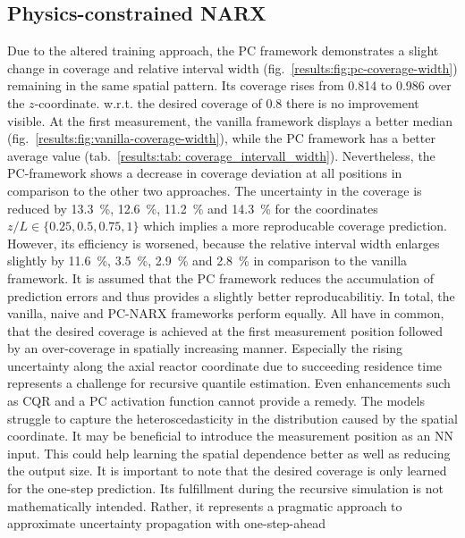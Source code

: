 \subsection{Physics-constrained NARX}

Due to the altered training approach, the PC framework demonstrates a slight change
in coverage and relative interval width (fig.~\ref{results:fig:pc-coverage-width}) remaining
in the same spatial pattern. Its coverage rises from \SI{0.814}{} to \SI{0.986}{} over the $z$-coordinate.
w.r.t. the desired coverage of $0.8$ there is no improvement visible. At the first measurement,
the vanilla framework displays a better median (fig.~\ref{results:fig:vanilla-coverage-width}),
while the PC framework has a better average value (tab.~\ref{results:tab: coverage_intervall_width}).
Nevertheless, the PC-framework shows a decrease in coverage deviation at all positions
in comparison to the other two approaches. The uncertainty in the coverage is reduced by 
\SI{13.3}{\%}, \SI{12.6}{\%}, \SI{11.2}{\%} and \SI{14.3}{\%} for the coordinates $z/L \in \{0.25, 0.5, 0.75, 1\}$
which implies a more reproducable coverage prediction.
However, its efficiency is worsened, because the relative interval width enlarges
slightly by \SI{11.6}{\%}, \SI{3.5}{\%}, \SI{2.9}{\%} and \SI{2.8}{\%}
in comparison to the vanilla framework. It is assumed that the PC framework reduces the accumulation
of prediction errors and thus provides a slightly better reproducabilitiy.
\newline
\newline
In total, the vanilla, naive and PC-NARX frameworks perform equally.
All have in common, that the desired coverage is achieved at the first measurement position
followed by an over-coverage in spatially increasing manner. Especially the rising uncertainty
along the axial reactor coordinate due to succeeding residence time represents a challenge
for recursive quantile estimation. Even enhancements such as CQR and a PC
activation function cannot provide a remedy. The models struggle to capture the heteroscedasticity in 
the distribution caused by the spatial coordinate. It may be beneficial to introduce
the measurement position as an NN input. This could help learning the spatial dependence better as well as
reducing the output size.
It is important to note that the desired coverage is only learned for the one-step prediction.
Its fulfillment during the recursive simulation is not mathematically intended.
Rather, it represents a pragmatic approach to approximate uncertainty propagation with one-step-ahead 

